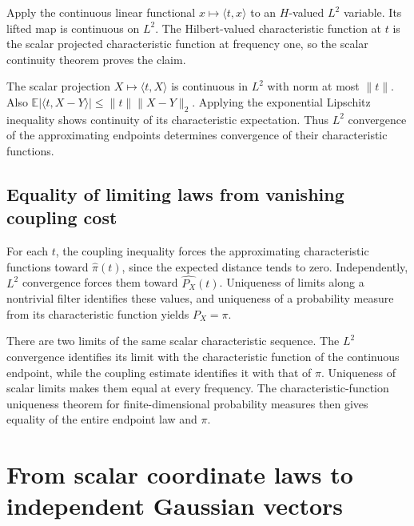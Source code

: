 \documentclass[11pt,a4paper]{report}
\begin{document}
Apply the continuous linear functional \(x\mapsto\langle t,x\rangle\) to an \(H\)-valued \(L^2\) variable. Its lifted map is continuous on \(L^2\). The Hilbert-valued characteristic function at \(t\) is the scalar projected characteristic function at frequency one, so the scalar continuity theorem proves the claim.



The scalar projection \(X\mapsto\langle t,X\rangle\) is continuous in \(L^2\) with norm at most \(\|t\|\). Also \(\mathbb E|\langle t,X-Y\rangle|\le\|t\|\|X-Y\|_2\). Applying the exponential Lipschitz inequality shows continuity of its characteristic expectation. Thus \(L^2\) convergence of the approximating endpoints determines convergence of their characteristic functions.

\subsection{\texorpdfstring{Equality of limiting laws from vanishing coupling cost}{Equality of limiting laws from vanishing coupling cost}}
\label{report-step-UnadjustedLangevin-CouplingLimit-lean-4}


For each \(t\), the coupling inequality forces the approximating characteristic functions toward \(\widehat\pi(t)\), since the expected distance tends to zero. Independently, \(L^2\) convergence forces them toward \(\widehat{P_X}(t)\). Uniqueness of limits along a nontrivial filter identifies these values, and uniqueness of a probability measure from its characteristic function yields \(P_X=\pi\).



There are two limits of the same scalar characteristic sequence. The \(L^2\) convergence identifies its limit with the characteristic function of the continuous endpoint, while the coupling estimate identifies it with that of \(\pi\). Uniqueness of scalar limits makes them equal at every frequency. The characteristic-function uniqueness theorem for finite-dimensional probability measures then gives equality of the entire endpoint law and \(\pi\).

\section{\texorpdfstring{From scalar coordinate laws to independent Gaussian vectors}{From scalar coordinate laws to independent Gaussian vectors}}
\label{proof-module-UnadjustedLangevin-GaussianInnovationVectors-lean}
\end{document}

